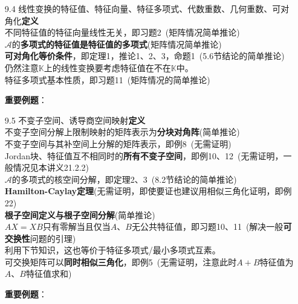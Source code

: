 \documentclass[a4paper,UTF8,fontset=windows,AutoFakeBold]{ctexart}
\newcommand*{\ma}{\mathcal{A}}
\newcommand*{\note}{\noindent *}
\begin{document}
\begin{enumerate}
    \item[9.4] 线性变换的特征值、特征向量、特征多项式、代数重数、几何重数、可对角化\textbf{定义}
    \\不同特征值的特征向量线性无关，即习题2\ (矩阵情况简单推论)
    \\$\ma$的\textbf{多项式的特征值是特征值的多项式}(矩阵情况简单推论)
    \\\textbf{可对角化等价条件}，即定理1，推论1、2、3，命题1\ (5.6节结论的简单推论)
    \\\note 仍然注意$\mathbb{K}$上的线性变换要考虑特征值在不在$\mathbb{K}$中。
    \\特征多项式基本性质，即习题11\ (矩阵情况的简单推论)

    \textbf{重要例题}：

    \item[9.5] 不变子空间、诱导商空间映射\textbf{定义}
    \\不变子空间分解上限制映射的矩阵表示为\textbf{分块对角阵}(简单推论)
    \\不变子空间与其补空间上分解的矩阵表示，即例8\ (无需证明)
    \\Jordan块、特征值互不相同时的\textbf{所有不变子空间}，即例10、12\ (无需证明，一般情况见本讲义21.2.2)
    \\$\ma$的多项式的核空间分解，即定理2、3\ (8.2节结论的简单推论)
    \\\textbf{Hamilton-Caylay定理}(无需证明，即使要证也建议用相似三角化证明，即例22)
    \\\textbf{根子空间定义与根子空间分解}(简单推论)
    \\$AX=XB$只有零解当且仅当$A$、$B$无公共特征值，即习题10、11\ (解决一般\textbf{可交换性}问题的引理)
    \\\note 利用下节知识，这也等价于特征多项式/最小多项式互素。
    \\可交换矩阵可以\textbf{同时相似三角化}，即例5\ (无需证明，注意此时$A+B$特征值为$A$、$B$特征值求和)

    \textbf{重要例题}：


\end{enumerate}
\end{document}
